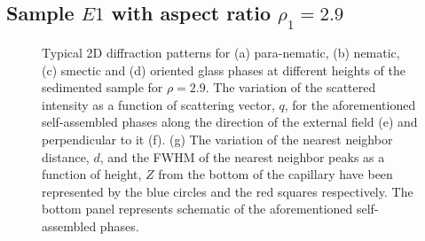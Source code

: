 \documentclass[aps,prl,preprint,superscriptaddress,showkeys]{revtex4-2} %
\begin{document}
\subsection{Sample $E1$ with aspect ratio $\rho_1 = 2.9$}
\begin{figure}[t]
\caption{Typical 2D diffraction patterns for (a) para-nematic, (b) nematic, (c) smectic and (d) oriented glass phases at different heights of the sedimented sample for $\rho=2.9$. The variation of the scattered intensity as a function of scattering vector, $q$, for the aforementioned self-assembled phases along the direction of the external field (e) and perpendicular to it (f). (g) The variation of the nearest neighbor distance, $d$, and the FWHM of the nearest neighbor peaks as a function of height, $Z$ from the bottom of the capillary have been represented by the blue circles and the red squares respectively. The bottom panel represents schematic of the aforementioned self-assembled phases.}\label{z_scan}
\end{figure} 
\end{document}
